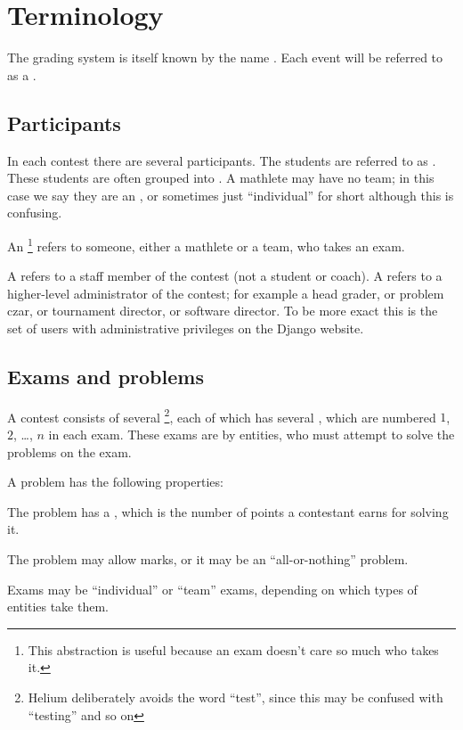 \chapter{Terminology}

The grading system is itself known by the name .
Each event will be referred to as a .

\section{Participants}
In each contest there are several participants.
The students are referred to as .
These students are often grouped into .
A mathlete may have no team; in this case we say they
are an ,
or sometimes just ``individual'' for short although this is confusing.

An \footnote{
	This abstraction is useful because an exam doesn't care so much who takes it.}
refers to someone,
either a mathlete or a team,
who takes an exam.

A  refers to a staff member of the contest
(not a student or coach).
A  refers to a higher-level administrator of the contest;
for example a head grader, or problem czar,
or tournament director, or software director.
To be more exact this is the set of users with administrative
privileges on the Django website.

\section{Exams and problems}
A contest consists of several \footnote{
	Helium deliberately avoids the word ``test'',
	since this may be confused with ``testing'' and so on},
each of which has several ,
which are numbered $1$, $2$, \dots, $n$ in each exam.
These exams are  by entities,
who must attempt to solve the problems on the exam.

A problem has the following properties:
\begin{itemize}
	\ii The problem has a ,
	which is the number of points a contestant earns for solving it.

	\ii The problem may allow  marks,
	or it may be an ``all-or-nothing'' problem.
\end{itemize}
Exams may be ``individual'' or ``team'' exams,
depending on which types of entities take them.

